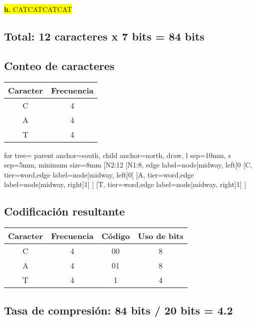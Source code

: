 \documentclass{article}
\begin{document}
	\vspace{0.5cm}
	\begin{center}
		\hspace{3cm}\colorbox{yellow}{{\textbf{h.} CATCATCATCAT}}\newline
		\subsection*{Total: 12 caracteres x 7 bits = 84 bits}
		\vspace{0.5cm}
		\subsection*{Conteo de caracteres}
		\begin{tabular}{c|c}
			\textbf{Caracter} & \textbf{Frecuencia} \\
			\hline
			C & 4 \\
			A & 4 \\
			T & 4 \\
		\end{tabular}
		
		\vspace{1cm}
		
		\begin{forest}
			for tree={
				parent anchor=south,
				child anchor=north,
				draw,
				l sep=10mm,
				s sep=5mm,
				minimum size=8mm
			}
			[N2:12
			[N1:8, edge label={node[midway, left]{0}}
			[C, tier=word,edge label={node[midway, left]{0}}]
			[A, tier=word,edge label={node[midway, right]{1}}]
			]
			[T, tier=word,edge label={node[midway, right]{1}}]
			]
		\end{forest}
		
		
		\subsection*{Codificación resultante}
		\begin{tabular}{c|c|c|c}
			\textbf{Caracter} & \textbf{Frecuencia} & \textbf{Código} & \textbf{Uso de bits}\\
			\hline
			C & 4 & 00 & 8\\
			A & 4 & 01 & 8\\
			T & 4 & 1 & 4\\
		\end{tabular}
		\subsection*{Tasa de compresión: 84 bits / 20 bits = 4.2}	
	\end{center}
	
\end{document}
